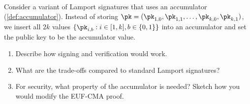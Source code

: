 \begin{exercise}[Optional]
  Consider a variant of Lamport signatures that uses an accumulator (\autoref{def:accumulator}).
  Instead of storing $\pk = (\pk_{1,0}, \pk_{1,1}, \ldots, \pk_{k,0}, \pk_{k,1})$, we insert all $2k$ values $\{\pk_{i,b} : i \in [1,k], b \in \{0,1\}\}$ into an accumulator and set the public key to be the accumulator value.
  \begin{enumerate}
    \item Describe how signing and verification would work.
    \item What are the trade-offs compared to standard Lamport signatures?
    \item For security, what property of the accumulator is needed?
    Sketch how you would modify the EUF-CMA proof.
  \end{enumerate}
\end{exercise}

